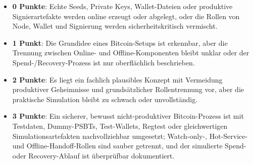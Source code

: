 \begin{itemize}
\item \textbf{0 Punkte}: Echte Seeds, Private Keys, Wallet-Dateien oder produktive Signierartefakte werden online erzeugt oder abgelegt, oder die Rollen von Node, Wallet und Signierung werden sicherheitskritisch vermischt.
\item \textbf{1 Punkt}: Die Grundidee eines Bitcoin-Setups ist erkennbar, aber die Trennung zwischen Online- und Offline-Komponenten bleibt unklar oder der Spend-/Recovery-Prozess ist nur oberflächlich beschrieben.
\item \textbf{2 Punkte}: Es liegt ein fachlich plausibles Konzept mit Vermeidung produktiver Geheimnisse und grundsätzlicher Rollentrennung vor, aber die praktische Simulation bleibt zu schwach oder unvollständig.
\item \textbf{3 Punkte}: Ein sicherer, bewusst nicht-produktiver Bitcoin-Prozess ist mit Testdaten, Dummy-PSBTs, Test-Wallets, Regtest oder gleichwertigen Simulationsartefakten nachvollziehbar umgesetzt; Watch-only-, Hot-Service- und Offline-Handoff-Rollen sind sauber getrennt, und der simulierte Spend- oder Recovery-Ablauf ist überprüfbar dokumentiert.
\end{itemize}
